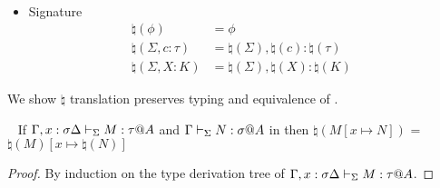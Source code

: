 \begin{definition}
\begin{multicols}{2}
\begin{itemize}
\begin{align*}
            \end{align*}
        \item Signature
            \begin{align*}
                \natural(\phi) &= \phi & \\
                \natural(\Sigma, c:\tau) &= \natural(\Sigma),\natural(c):\natural(\tau) & \\
                \natural(\Sigma, X:K) &= \natural(\Sigma), \natural(X):\natural(K) &
            \end{align*}
    \end{itemize}
    \end{multicols}
\end{definition}

We show \( \natural \) translation preserves typing and equivalence of \LMD.

\begin{lemma}\
    \label{lemma:SubstitutionAndNatural}
    If \( \G, x:\sigma \D \V M:\tau@A \) and \( \G \V N:\sigma@A\) in \LMD
    then $\natural(M[x \mapsto N])$ = $\natural(M)[x\mapsto\natural(N)]$
\end{lemma}

\begin{proof}
    By induction on the type derivation tree of $\G, x:\sigma \D \V M:\tau@A$.
\end{proof}

